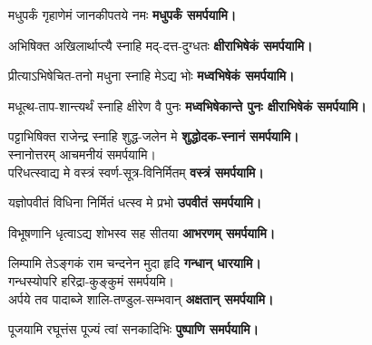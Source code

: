\begin{center}
{मधुपर्कं गृहाणेमं जानकीपतये नमः}
\textbf{\devAya{} मधुपर्कं समर्पयामि।\\}

{अभिषिक्त अखिलार्थाप्त्यै स्नाहि मद्-दत्त-दुग्धतः}
\textbf{\devAya{} क्षीराभिषेकं समर्पयामि।\\}

{प्रीत्याऽभिषेचित-तनो मधुना स्नाहि मेऽद्य भोः}
\textbf{\devAya{} मध्वभिषेकं समर्पयामि।\\}

{मधूत्थ-ताप-शान्त्यर्थं स्नाहि क्षीरेण वै पुनः}
\textbf{\devAya{} मध्वभिषेकान्ते पुनः क्षीराभिषेकं समर्पयामि।\\}

{पट्टाभिषिक्त राजेन्द्र स्नाहि शुद्ध-जलेन मे}
\textbf{\devAya{} शुद्धोदक-स्नानं समर्पयामि।\\}
स्नानोत्तरम् आचमनीयं समर्पयामि।\\

{परिधत्स्वाद्य मे वस्त्रं स्वर्ण-सूत्र-विनिर्मितम्}
\textbf{\devAya{} वस्त्रं समर्पयामि।\\}

{यज्ञोपवीतं विधिना निर्मितं धत्स्व मे प्रभो}
\textbf{\devAya{} उपवीतं समर्पयामि।\\}

{विभूषणानि धृत्वाऽद्य शोभस्व सह सीतया}
\textbf{\devAya{} आभरणम् समर्पयामि।\\}

{लिम्पामि तेऽङ्गकं राम चन्दनेन मुदा हृदि}
\textbf{\devAya{} गन्धान् धारयामि।\\}
गन्धस्योपरि हरिद्रा-कुङ्कुमं समर्पयमि।\\

{अर्पये तव पादाब्जे शालि-तण्डुल-सम्भवान्}
\textbf{\devAya{} अक्षतान् समर्पयामि।\\}

{पूजयामि रघूत्तंस पूज्यं त्वां सनकादिभिः}
\textbf{\devAya{} पुष्पाणि समर्पयामि।}


\end{center}

